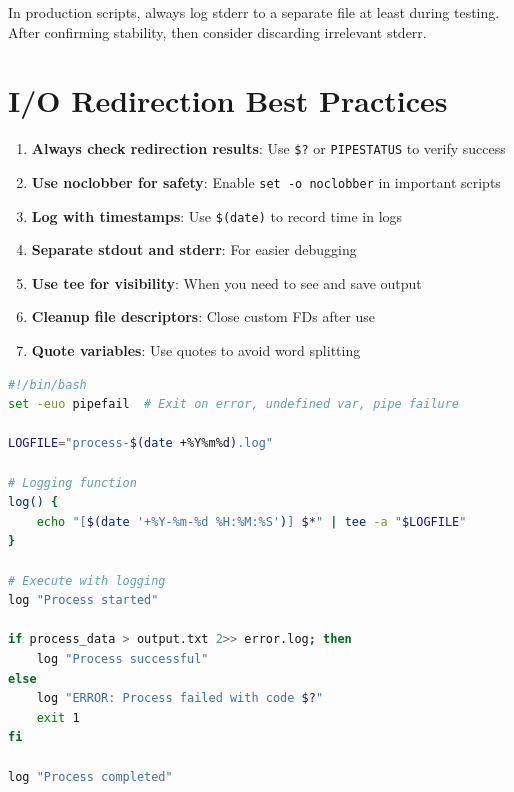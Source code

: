 \begin{tipbox}
	In production scripts, always log stderr to a separate file at least during testing. After confirming stability, then consider discarding irrelevant stderr.
\end{tipbox}

\section{I/O Redirection Best Practices}
\label{sec:io-best-practices}

\begin{enumerate}
	\item \textbf{Always check redirection results}: Use \texttt{\$?} or \texttt{PIPESTATUS} to verify success

	\item \textbf{Use noclobber for safety}: Enable \texttt{set -o noclobber} in important scripts

	\item \textbf{Log with timestamps}: Use \texttt{\$(date)} to record time in logs

	\item \textbf{Separate stdout and stderr}: For easier debugging

	\item \textbf{Use tee for visibility}: When you need to see and save output

	\item \textbf{Cleanup file descriptors}: Close custom FDs after use

	\item \textbf{Quote variables}: Use quotes to avoid word splitting
\end{enumerate}

\begin{lstlisting}[language=bash, caption={Best practice example}]
#!/bin/bash
set -euo pipefail  # Exit on error, undefined var, pipe failure

LOGFILE="process-$(date +%Y%m%d).log"

# Logging function
log() {
    echo "[$(date '+%Y-%m-%d %H:%M:%S')] $*" | tee -a "$LOGFILE"
}

# Execute with logging
log "Process started"

if process_data > output.txt 2>> error.log; then
    log "Process successful"
else
    log "ERROR: Process failed with code $?"
    exit 1
fi

log "Process completed"
\end{lstlisting}

